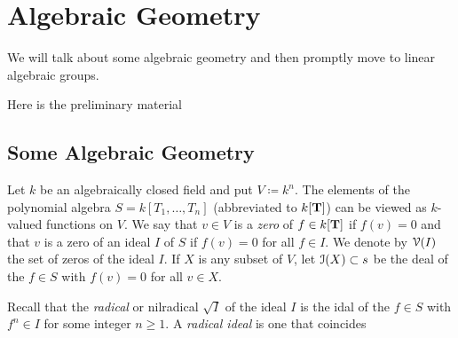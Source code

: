 \chapter{Algebraic Geometry}
We will talk about some algebraic geometry and then promptly move to linear
algebraic groups.

Here is the preliminary material
\section{Some Algebraic Geometry}
Let $k$ be an algebraically closed field and put $V\coloneqq k^n$. The
elements of the polynomial algebra $S=k[T_1,\dotsc,T_n]$ (abbreviated to
$k[\mathbf{T}]$) can be viewed as $k$-valued functions on $V$. We say that $v\in
V$ is a \emph{zero} of $f\in k[\mathbf{T}]$ if $f(v)=0$ and that $v$ is a zero of
an ideal $I$ of $S$ if $f(v)=0$ for all $f\in I$. We denote by $\mathcal{V}(I)$
the set of zeros of the ideal $I$. If $X$ is any subset of $V$, let
$\mathcal{I}(X)\subset s$ be the deal of the $f\in S$ with $f(v)=0$ for all $v\in
X$.

Recall that the \emph{radical} or nilradical $\sqrt{I}$ of the ideal $I$ is
the idal of the $f\in S$ with $f^n\in I$ for some integer $n\geq 1$. A
\emph{radical ideal} is one that coincides

